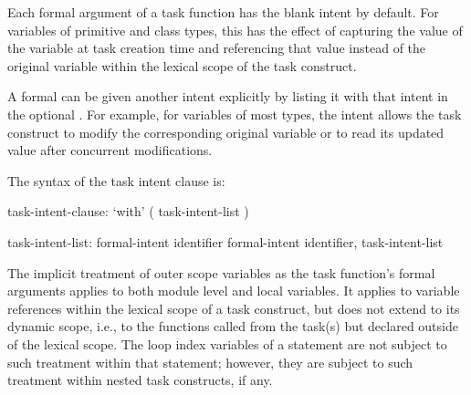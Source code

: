 Each formal argument of a task function has the blank intent by default.
For variables of primitive and class types, this has the effect
of capturing the value of the variable at task creation time
and referencing that value instead of the original variable
within the lexical scope of the task construct.

A formal can be given another intent explicitly by listing it
with that intent in the optional .
For example, for variables of most types, the  intent allows
the task construct to modify the corresponding original variable
or to read its updated value after concurrent modifications.

The syntax of the task intent clause is:

\begin{syntax}
task-intent-clause:
  `with' ( task-intent-list )

task-intent-list:
  formal-intent identifier
  formal-intent identifier, task-intent-list
\end{syntax}

The implicit treatment of outer scope variables as the task function's
formal arguments applies to both module level and local variables.
It applies to variable references within the lexical scope
of a task construct, but does not extend to its dynamic scope, i.e.,
to the functions called from the task(s) but declared outside of
the lexical scope.
The loop index variables of a  statement are not
subject to such treatment within that statement; however, they are
subject to such treatment within nested task constructs, if any.


